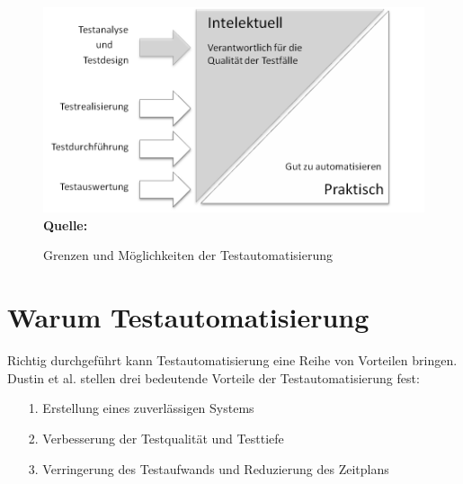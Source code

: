 \begin{figure}[htb]
  \centering  
  \includegraphics[scale=1]{img/intelektuellVsPraktisch.png}\\
  \footnotesize\sffamily\textbf{Quelle:} \cite[vgl. S.18]{fewster_software_1999}
  \caption{Grenzen und Möglichkeiten der Testautomatisierung}
  \label{fig:intellektuellVsPraktisch}
\end{figure}

\section{Warum Testautomatisierung}
\label{sec:warum_testautomatisierung}

Richtig durchgeführt kann Testautomatisierung eine Reihe von Vorteilen bringen. Dustin et al.  \cite[S.44 ff.]{dustin_software_2001} stellen drei bedeutende Vorteile der Testautomatisierung fest:
\begin{itemize}
\item[1.] Erstellung eines zuverlässigen Systems
\item[2.] Verbesserung der Testqualität und Testtiefe
\item[3.] Verringerung des Testaufwands und Reduzierung des Zeitplans
\end{itemize}


